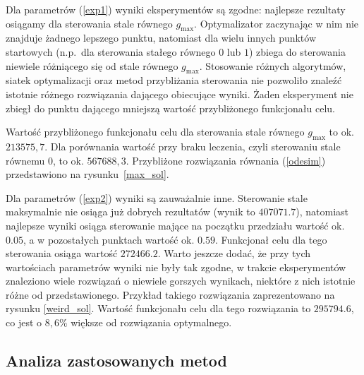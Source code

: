 \documentclass[11pt]{article}
\begin{document}
Dla parametrów (\ref{exp1}) wyniki eksperymentów są zgodne: najlepsze rezultaty osiągamy dla sterowania stale równego $g_{\max}$. Optymalizator zaczynając w nim nie znajduje żadnego lepszego punktu, natomiast dla wielu innych punktów startowych (n.p.\ dla sterowania stałego równego $0$ lub $1$) zbiega do sterowania niewiele różniącego się od stale równego $g_{\max}$. Stosowanie różnych algorytmów, siatek optymalizacji oraz metod przybliżania sterowania nie pozwoliło znaleźć istotnie różnego rozwiązania dającego obiecujące wyniki. Żaden eksperyment nie zbiegł do punktu dającego mniejszą wartość przybliżonego funkcjonału celu.

Wartość przybliżonego funkcjonału celu dla sterowania stale równego $g_{\max}$ to ok. $213575,7$. Dla porównania wartość przy braku leczenia, czyli sterowaniu stale równemu $0$, to ok. $567688,3$. Przybliżone rozwiązania równania (\ref{odesim}) przedstawiono na rysunku~\ref{max_sol}.

Dla parametrów (\ref{exp2}) wyniki są zauważalnie inne. Sterowanie stale maksymalnie nie osiąga już dobrych rezultatów (wynik to $407071.7$), natomiast najlepsze wyniki osiąga sterowanie mające na początku przedziału wartość ok. $0.05$, a w pozostałych punktach wartość ok. $0.59$. Funkcjonał celu dla tego sterowania osiąga wartość $272466.2$. Warto jeszcze dodać, że przy tych wartościach parametrów wyniki nie były tak zgodne, w trakcie eksperymentów znaleziono wiele rozwiązań o niewiele gorszych wynikach, niektóre z nich istotnie różne od przedstawionego. Przykład takiego rozwiązania zaprezentowano na rysunku \ref{weird_sol}. Wartość funkcjonału celu dla tego rozwiązania to $295794.6$, co jest o $8,6\%$ większe od rozwiązania optymalnego.


\subsection{Analiza zastosowanych metod}
\end{document}
